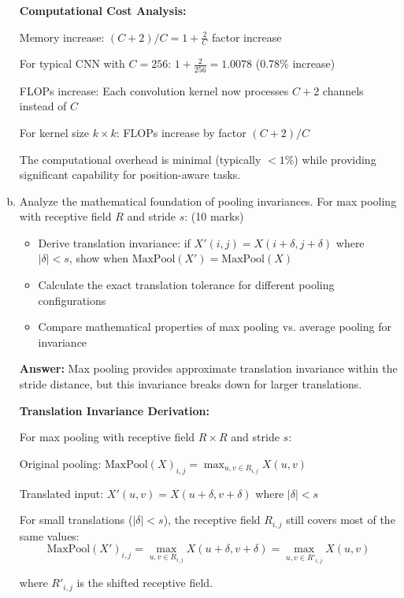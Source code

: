 \documentclass[12pt]{article}
\newcommand{\answer}[1]{{\color{answercolor}\textbf{Answer:} #1}}
\newcommand{\explanation}[1]{{\color{explanationcolor}#1}}
\begin{document}
\begin{enumerate}[(a)]
{    \textbf{Computational Cost Analysis:}
    
    Memory increase: $(C+2)/C = 1 + \frac{2}{C}$ factor increase
    
    For typical CNN with $C=256$: $1 + \frac{2}{256} = 1.0078$ (0.78\% increase)
    
    FLOPs increase: Each convolution kernel now processes $C+2$ channels instead of $C$
    
    For kernel size $k \times k$: FLOPs increase by factor $(C+2)/C$
    
    The computational overhead is minimal (typically $<1\%$) while providing significant capability for position-aware tasks.
    }
    
    \item Analyze the mathematical foundation of pooling invariances. For max pooling with receptive field $R$ and stride $s$: \hfill (10 marks)
    \begin{itemize}
        \item Derive translation invariance: if $X'(i,j) = X(i+\delta, j+\delta)$ where $|\delta| < s$, show when $\text{MaxPool}(X') = \text{MaxPool}(X)$
        \item Calculate the exact translation tolerance for different pooling configurations
        \item Compare mathematical properties of max pooling vs. average pooling for invariance
    \end{itemize}
    
    \answer{Max pooling provides approximate translation invariance within the stride distance, but this invariance breaks down for larger translations.}
    
    \explanation{
    \textbf{Translation Invariance Derivation:}
    
    For max pooling with receptive field $R \times R$ and stride $s$:
    
    Original pooling: $\text{MaxPool}(X)_{i,j} = \max_{u,v \in R_{i,j}} X(u,v)$
    
    Translated input: $X'(u,v) = X(u+\delta, v+\delta)$ where $|\delta| < s$
    
    For small translations ($|\delta| < s$), the receptive field $R_{i,j}$ still covers most of the same values:
    $$\text{MaxPool}(X')_{i,j} = \max_{u,v \in R_{i,j}} X(u+\delta, v+\delta) = \max_{u,v \in R'_{i,j}} X(u,v)$$
    
    where $R'_{i,j}$ is the shifted receptive field.
    
}
\end{enumerate}
\end{document}

